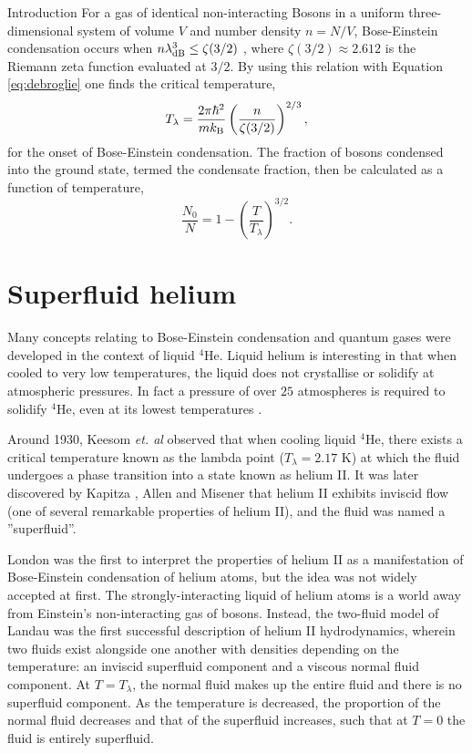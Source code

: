 \begin{chapter}{\label{cha:bose_gases}Introduction}
For a gas of identical non-interacting Bosons in a uniform three-dimensional system of volume $V$ and number density $n=N/V$, Bose-Einstein condensation occurs when $n\lambda_{\rm dB}^3 \leq \zeta(3/2)$ \cite{Pethick,huang1987statistical}, where $\zeta(3/2)\approx2.612$ is the Riemann zeta function evaluated at $3/2$. By using this relation with Equation \ref{eq:debroglie} one finds the critical temperature,
\begin{equation}
T_\lambda = \frac{2\pi\hbar^2}{mk_{\rm B}} \left ( \frac{n}{\zeta(3/2)} \right )^{2/3},
\label{eq:tlambda}
\end{equation}
for the onset of Bose-Einstein condensation. The fraction of bosons condensed into the ground state, termed the condensate fraction, then be calculated as a function of temperature,
\begin{equation}
	\frac{N_0}{N} = 1 - \left( \frac{T}{T_\lambda}\right )^{3/2}.
\end{equation}

\section{Superfluid helium}
Many concepts relating to Bose-Einstein condensation and quantum gases were developed in the context of liquid $^4$He. Liquid helium is interesting in that when cooled to very low temperatures, the liquid does not crystallise or solidify at atmospheric pressures. In fact a pressure of over $25$ atmospheres is required to solidify $^4$He, even at its lowest temperatures \cite{Pethick}. 

Around 1930, Keesom {\it et. al} \cite{Keesom27,Keesom35} observed that when cooling liquid $^4$He, there exists a critical temperature known as the lambda point ($T_\lambda = 2.17$ K) at which the fluid undergoes a phase transition into a state known as helium II. It was later discovered by Kapitza \cite{Kapitza}, Allen and Misener \cite{Allen38} that helium II exhibits inviscid flow (one of several remarkable properties of helium II), and the fluid was named a ''superfluid''.

London \cite{London38,London38b} was the first to interpret the properties of helium II as a manifestation of Bose-Einstein condensation of helium atoms, but the idea was not widely accepted at first. The strongly-interacting liquid of helium atoms is a world away from Einstein's non-interacting gas of bosons. Instead, the two-fluid model of Landau \cite{Landau41} was the first successful description of helium II hydrodynamics, wherein two fluids exist alongside one another with densities depending on the temperature: an inviscid superfluid component and a viscous normal fluid component. At $T=T_\lambda$, the normal fluid makes up the entire fluid and there is no superfluid component. As the temperature is decreased, the proportion of the normal fluid decreases and that of the superfluid increases, such that at $T=0$ the fluid is entirely superfluid.


\end{chapter}
